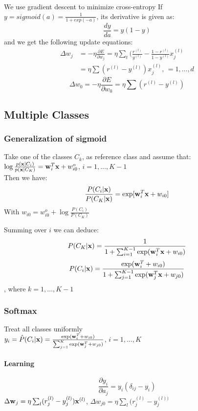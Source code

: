 \begin{description}
        We use gradient descent to minimize cross-entropy 
        If $y = sigmoid(a) = \frac{1}{1 + exp(-a)}$, its derivative is given as:
        \[ \frac{dy}{da} = y(1-y) \]
        and we get the following update equations:
        \begin{align*}
            \Delta w_j & = -\eta \frac{\partial E}{\partial w_j} = \eta \sum_t
            ({\frac{r^{(l)}}{y^{(l)}}} - \frac{1-r^{(l)}}{1-y^{(l)}}x^{(l)}_j \\
            & = \eta \sum(r^{(l)} - y^{(l)}) x^{(l)}_j\mbox{, }= 1,\dots, d 
        \end{align*}
        \[
            \Delta w_0 = -\eta \frac{\partial E}{\partial w_0} = \eta\sum(r^{(l)} -
            y^{(l)}) 
        \]
\end{description}
\subsection{Multiple Classes}
\subsubsection{Generalization of sigmoid}
    Take one of the classes $C_k$, as reference class
        and assume that: \\
        $ \log\frac{p(\mathbf{x}|C_i)}{p(\mathbf{x}|C_K)} = \mathbf{w}_i^T\mathbf{x}+ w_{i0}^o $,
        $i=1,\dots,K-1$\\
        Then we have:
        \[ \frac{P(C_i|\mathbf{x})}{P(C_K|\mathbf{x})} = \exp[\mathbf{w}_i^T\mathbf{x}+w_{i0}] \]
        With $w_{i0} = w_{i0}^o + \log\frac{P(C_i)}{P(C_K)}$

     Summing over $i$ we can deduce: 
         \[P(C_K|\mathbf{x}) =
         \frac{1}{1+\sum_{i=1}^{K-1}\exp(\mathbf{w}_i^T\mathbf{x} + w_{i0})}\]
        \[P(C_i|\mathbf{x})
        =\frac{\exp(\mathbf{w}_i^T+w_{i0})}{1+\sum_{j=1}^{K-1}\exp(\mathbf{w}_j^T\mathbf{x}+w_{j0})}\],
    where $k=1,\dots, K-1$
\subsubsection{Softmax}
    Treat all classes uniformly\\ $y_i = \hat{P}(C_i|\mathbf{x}) =
        \frac{\exp(\mathbf{w}_i^T+w_{i0})}{\sum_{j=1}^K\exp(\mathbf{w}_j^T+w_{j0})}$,
        $i=1,\dots, K$
    \paragraph{Learning} 
        \[\frac{\partial y_i}{\partial a_j} = y_i (\delta_{ij}-y_i)\]
        $\Delta\mathbf{w}_j = \eta\sum_l(r_j^{(l)}-y_j^{(l)})\mathbf{x}^{(l)}$, $
        \Delta w_{j0} = \eta\sum_l(r_j^{(l)}-y_j^{(l))}$
